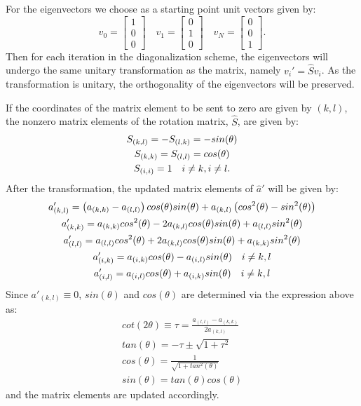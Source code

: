 \documentclass[prc,amsmath,twocolumn,superscriptaddress]{revtex4}
\begin{document}
For the eigenvectors we choose as a starting point unit vectors given by:
\begin{equation}
v_0=\begin{bmatrix} 1  \\ 0\\ 0 \end{bmatrix}\quad v_1=\begin{bmatrix} 0  \\ 1\\ 0 \end{bmatrix}
\quad v_N=\begin{bmatrix} 0  \\ 0\\ 1 \end{bmatrix}.
\label{matrix}
\end{equation}
Then for each iteration in the diagonalization scheme, the eigenvectors will undergo the same unitary transformation as the matrix, namely $v_i'=\hat{S}v_i$. As the transformation is unitary, the orthogonality of the eigenvectors will be preserved.

If the coordinates of the matrix element to be sent to zero are given by $(k,l)$, the nonzero matrix elements of the rotation matrix, $\hat{S}$, are given by:
\begin{gather}
S_{(k,l)}=-S_{(l,k)}=-sin(\theta) \notag \\
S_{(k,k)}=S_{(l,l)}=cos(\theta) \notag \\
S_{(i,i)}=1 \quad i\neq k, i\neq l.
\end{gather}
After the transformation, the updated matrix elements of $\hat{a}'$ will be given by:
\begin{gather}
a'_{(k,l)}= \left(a_{(k,k)}-a_{(l,l)}\right)cos(\theta)sin(\theta)+a_{(k,l)}\left(cos^2(\theta)-sin^2(\theta)\right)  \notag \\
a'_{(k,k)}= a_{(k,k)}cos^2(\theta)-2a_{(k,l)}cos(\theta)sin(\theta)+a_{(l,l)}sin^2(\theta) \notag \\
a'_{(l,l)}= a_{(l,l)}cos^2(\theta)+2a_{(k,l)}cos(\theta)sin(\theta)+a_{(k,k)}sin^2(\theta) \notag \\
a'_{(i,k)}= a_{(i,k)}cos(\theta)-a_{(i,l)}sin(\theta) \quad i\neq k,l\notag \\
a'_{(i,l)}= a_{(i,l)}cos(\theta)+a_{(i,k)}sin(\theta) \quad i\neq k,l 
\end{gather}
Since $a'_{(k,l)}\equiv0$, $sin(\theta)$ and $cos(\theta)$ are determined via the expression above as:
\begin{gather}
cot(2\theta)\equiv \tau =\frac{a_{(l,l)}-a_{(k,k)}}{2a_{(k,l)}} \\
tan(\theta)=-\tau \pm \sqrt{1+\tau^2} \\
cos(\theta)=\frac{1}{\sqrt{1+tan^2(\theta)}} \\
sin(\theta) = tan(\theta)cos(\theta) 
\end{gather}
and the matrix elements are updated accordingly.
\end{document}
